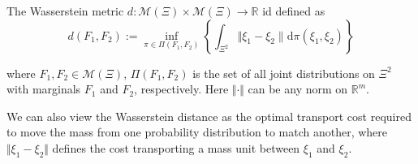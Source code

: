 \begin{definition} The Wasserstein metric $d : \mathcal{M}(\Xi) \times \mathcal{M}(\Xi) \rightarrow \mathbb{R}$ id defined as 
\begin{equation}
    d(F_1, F_2) := \inf_{\pi \in \Pi(F_1, F_2)} \left\{
    \int_{\Xi^2} \Vert \xi_1 - \xi_2 \| \mathrm{d} \pi(\xi_1, \xi_2) 
    \right\}
\end{equation}

where $F_1, F_2 \in \mathcal{M}(\Xi)$, $\Pi(F_1, F_2)$ is the set of all joint distributions on $\Xi^2$ with marginals $F_1$ and $F_2$, respectively. Here $\Vert \cdot \Vert$ can be any norm on $\mathbb{R}^m$.

\end{definition}

We can also view the Wasserstein distance as the optimal transport cost required to move the mass from one probability distribution to match another, where $\Vert \xi_1 - \xi_2 \Vert$ defines the cost transporting a mass unit between $\xi_1$ and $\xi_2$.